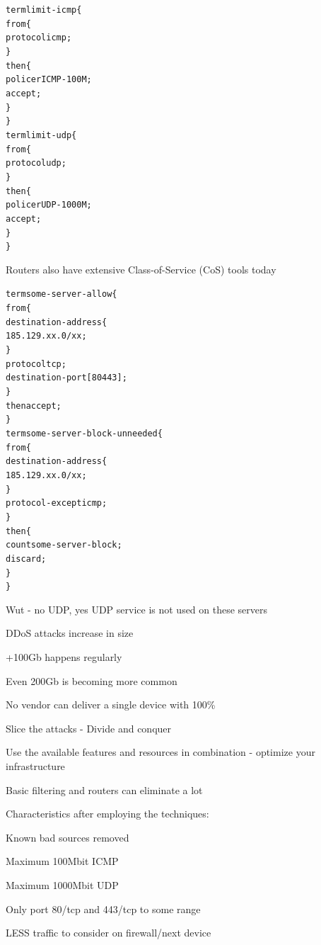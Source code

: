 \documentclass[20pt,landscape,a4paper,footrule]{foils}
\begin{document}





\begin{alltt}\footnotesize
term limit-icmp \{
    from \{
        protocol icmp;
    \}
    then \{
        policer ICMP-100M;
        accept;
    \}
\}
term limit-udp \{
    from \{
        protocol udp;
    \}
    then \{
        policer UDP-1000M;
        accept;
    \}
\}
\end{alltt}

Routers also have extensive Class-of-Service (CoS) tools today


\begin{alltt}\footnotesize
term some-server-allow \{
    from \{
        destination-address \{
            185.129.xx.0/xx;
        \}
        protocol tcp;
        destination-port [ 80 443 ];
    \}
    then accept;
\}
term some-server-block-unneeded \{
    from \{
        destination-address \{
            185.129.xx.0/xx;
        \}
        protocol-except icmp;
    \}
    then \{
        count some-server-block;
        discard;
    \}
\}
\end{alltt}

Wut - no UDP, yes UDP service is not used on these servers



\begin{list1}
\item DDoS attacks increase in size
\item +100Gb happens regularly
\item Even 200Gb is becoming more common
\item No vendor can deliver a single device with 100\%
\item Slice the attacks - Divide and conquer
\item Use the available features and resources in combination - optimize your infrastructure
\end{list1}


\begin{list1}
\item Basic filtering and routers can eliminate a lot

\item Characteristics after employing the techniques:
\item Known bad sources removed
\item Maximum 100Mbit ICMP
\item Maximum 1000Mbit UDP
\item Only port 80/tcp and 443/tcp to some range
\end{list1}
\centerline{LESS traffic to consider on firewall/next device}
\end{document}
